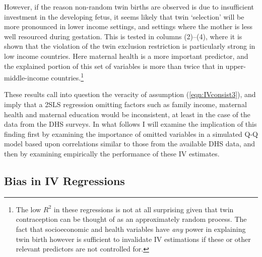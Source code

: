 \documentclass{article}[11pt,subeqn]
\begin{document}
\begin{spacing}{1.5}
However, if the reason non-random twin births are observed is due to insufficient investment in the developing fetus, it seems likely that
 twin `selection' will be more pronounced in lower income settings, and settings where the mother is less well resourced during gestation.  
This is tested in columns (2)--(4), where it is shown that the violation of the twin exclusion restriction is particularly
strong in low income countries.  Here maternal health is a more important predictor, and the explained portion of this set of variables is more than
twice that in upper-middle-income countries.\footnote{The low $R^2$ in these regressions is not at all surprising given that twin contraception
can be thought of as an approximately random process.  The fact that socioeconomic and health variables have \emph{any} power in explaining
twin birth however is sufficient to invalidate IV estimations if these or other relevant predictors are not controlled for.}

These results call into question the veracity of assumption (\ref{eqn:IVconsist3}), and imply that a 2SLS regression omitting factors such as family
income, maternal health and maternal education would be inconsistent, at least in the case of the data from the DHS surveys.  In what follows
I will examine the implication of this finding first by examining the importance of omitted variables in a simulated Q-Q model based upon
correlations similar to those from the available DHS data, and then by examining empirically the performance of these IV estimates.  
\subsection{Bias in IV Regressions}
\label{scn:bias}

\end{spacing}
\end{document}
